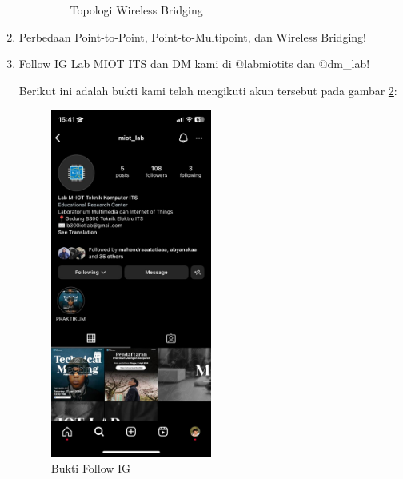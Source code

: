\begin{enumerate}
\begin{enumerate}
\begin{figure}[htb]
            \caption{Topologi Wireless Bridging}
            \label{fig:topo3}
          \end{figure}
      \end{enumerate}
  \item Perbedaan Point-to-Point, Point-to-Multipoint, dan Wireless Bridging!
        
  \item Follow IG Lab MIOT ITS dan DM kami di @labmiotits dan @dm\_lab!
  
  Berikut ini adalah bukti kami telah mengikuti akun tersebut pada gambar \ref{fig:ig}:

  \begin{figure}[H]
    \centering
    \includegraphics[width=0.5\textwidth]{img/ss_follow_b3.jpeg}
    \caption{Bukti Follow IG}
    \label{fig:ig}
  \end{figure}
        
\end{enumerate}